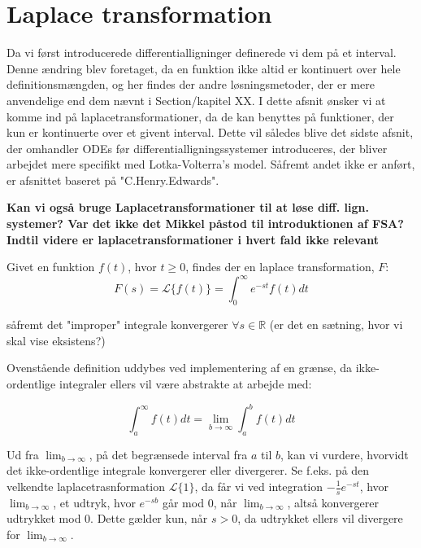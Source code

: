 \section{Laplace transformation}
Da vi først introducerede differentialligninger definerede vi dem på et interval. Denne ændring blev foretaget, da en funktion ikke altid er kontinuert over hele definitionsmængden, og her findes der andre løsningsmetoder, der er mere anvendelige end dem nævnt i Section/kapitel XX. I dette afsnit ønsker vi at komme ind på laplacetransformationer, da de kan benyttes på funktioner, der kun er kontinuerte over et givent interval. Dette vil således blive det sidste afsnit, der omhandler ODEs før differentialligningssystemer introduceres, der bliver arbejdet mere specifikt med Lotka-Volterra's model. Såfremt andet ikke er anført, er afsnittet baseret på "C.Henry.Edwards".

\textbf{Kan vi også bruge Laplacetransformationer til at løse diff. lign. systemer? Var det ikke det Mikkel påstod til introduktionen af FSA? Indtil videre er laplacetransformationer i hvert fald ikke relevant}


\begin{definition}
Givet en funktion $f(t)$, hvor $t \geq 0$, findes der en laplace transformation, $F$:
$$F(s) = \mathcal{L} \{ f(t)\} = \int_{0}^{\infty} e^{-st}f(t)dt $$

såfremt  det "improper" integrale konvergerer $\forall s \in \mathbb{R}$ (er det en sætning, hvor vi skal vise eksistens?)

\end{definition}

Ovenstående definition uddybes ved implementering af en grænse, da ikke-ordentlige integraler ellers vil være abstrakte at arbejde med:

\begin{equation}\label{BToInf}
    \int_a^\infty f(t) dt = \lim_{b\to\infty} \int_a^b f(t) dt
\end{equation}

Ud fra $\lim_{b\to\infty}$, på det begrænsede interval fra $a$ til $b$, kan vi vurdere, hvorvidt det ikke-ordentlige integrale konvergerer eller divergerer. Se f.eks. på den velkendte laplacetrasnformation $\mathcal{L}\{1\}$, da får vi ved integration $-\frac{1}{s}e^{-st}$, hvor $\lim_{b\to\infty}$, et udtryk, hvor $e^{-sb}$ går mod $0$, når $\lim_{b\to\infty}$, altså konvergerer udtrykket mod 0. Dette gælder kun, når $s > 0$, da udtrykket ellers vil divergere for $\lim_{b\to\infty}$.
\hfill \break


